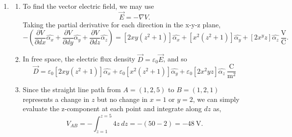 \documentclass{article}
\begin{document}
\begin{enumerate}
	Then, finding flux density tangent to the outer surface, we may use the relationship between flux densities tangent to the boundary. Mathematically, \[
		\frac{D_{1t}}{\varepsilon_1} = \frac{D_{2t}}{\varepsilon_2} \Rightarrow D_{1t} = \frac{\varepsilon_1}{\varepsilon_2}D_{2t}.
	\]
	Given the components of \(\vec{D}_2\) tangent to the boundary, \(2 \hat{\alpha_{\theta}} - 3 \hat{\alpha_\phi}\), and permittivities of \(\varepsilon_1 = 4\), \(\varepsilon_2=2\), \[
		D_{2t} = \frac{4}{2}(2\hat{\alpha_\theta} - 3 \hat{\alpha_\phi}) = 4 \hat{\alpha_\theta} - 6 \hat{\alpha_\phi}.
	\]
	Combining the two components, \[
	  \vec{D}_1 = 2.2 \hat{\alpha_R} + 4 \hat{\alpha_\theta} - 6 \hat{\alpha_\phi}.
	\] 
\item 
	\begin{enumerate}[label=\alph*)]
		\item To find the vector electric field, we may use \[
		  \vec{E} = -\nabla V.
		\]
    Taking the partial derivative for each direction in the x-y-z plane, \[
			-(\frac{\partial V}{\partial dx}\hat{\alpha_x} + \frac{\partial V}{\partial dy}\hat{\alpha_y} + \frac{\partial V}{\partial dz}\hat{\alpha_z}) = [2xy(z^2+1)] \hat{\alpha_x} + [x^2(z^2+1)]\hat{\alpha_y} + [2x^yz] \hat{\alpha_z} \ \mathrm{\frac{V}{C}}.
    \]
	\item In free space, the electric flux density \(\vec{D} = \varepsilon_0 \vec{E}\), and so \[
			\vec{D} = \varepsilon_0 [2xy(z^2+1)] \hat{\alpha_x} + \varepsilon_0 [x^2(z^2+1)]\hat{\alpha_y} + \varepsilon_0 [2x^2yz] \hat{\alpha_z} \ \mathrm{\frac{C}{m^2}} 
	\]
\item Since the straight line path from \(A = (1,2,5)\) to \(B=(1,2,1)\) represents a change in \(z\) but no change in \(x=1\) or \(y=2\), we can simply evaluate the z-component at each point and integrate along \(dz\) as, \[
		V_{AB} = -\int_{z=1}^{z=5}4z \ dz = -(50-2) = -48 \ \mathrm{V}.
\]
	\end{enumerate}
\end{enumerate}
\end{document}
